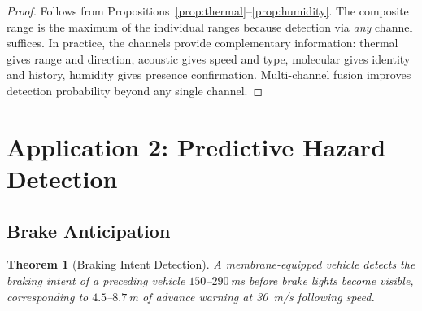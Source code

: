 \documentclass[11pt,twocolumn,a4paper]{article}
\theoremstyle{plain}
\newtheorem{theorem}{Theorem}[section]
\theoremstyle{definition}
\theoremstyle{remark}
\begin{document}
\begin{proof}
Follows from Propositions~\ref{prop:thermal}--\ref{prop:humidity}. The composite range is the maximum of the individual ranges because detection via \emph{any} channel suffices. In practice, the channels provide complementary information: thermal gives range and direction, acoustic gives speed and type, molecular gives identity and history, humidity gives presence confirmation. Multi-channel fusion improves detection probability beyond any single channel.
\end{proof}




\section{Application 2: Predictive Hazard Detection}
\label{sec:predictive_hazard}

\subsection{Brake Anticipation}

\begin{theorem}[Braking Intent Detection]
\label{thm:braking}
A membrane-equipped vehicle detects the braking intent of a preceding vehicle $150$--$290$\,ms before brake lights become visible, corresponding to $4.5$--$8.7$\,m of advance warning at \SI{30}{m/s} following speed.
\end{theorem}
\end{document}
